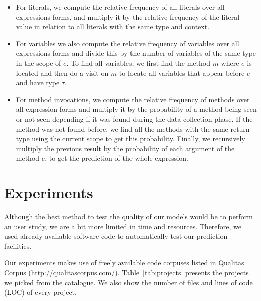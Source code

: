 \documentclass{article} %
\begin{document}
\begin{itemize}
   \item For literals, we compute the relative frequency of all literals over all expressions forms, and multiply it by the relative frequency of the literal value in relation to all literals with the same type and context.
   \item For variables we also compute the relative frequency of variables over all expressions forms and divide this by the number of variables of the same type in the scope of $e$. To find all variables, we first find the method $m$ where $e$ is located and then do a visit on $m$ to locate all variables that appear before $e$ and have type $\tau$.
   \item For method invocations, we compute the relative frequency of methods over all expression forms and multiply it by the probability of a method being seen or not seen depending if it was found during the data collection phase. If the method was not found before, we find all the methods with the same return type using the current scope to get this probability. Finally, we recursively multiply the previous result by the probability of each argument of the method $e$, to get the prediction of the whole expression.
\end{itemize}

\section*{Experiments}

Although the best method to test the quality of our models would be to perform an user study, we are a bit more limited in time and resources. Therefore, we used already available software code to automatically test our prediction facilities.

Our experiments makes use of freely available code corpuses listed in Qualitas Corpus (\url{http://qualitascorpus.com/}).
Table~\ref{tab:projects} presents the projects we picked from the catalogue. We also show the number of files and
lines of code (LOC) of every project.
\end{document}
